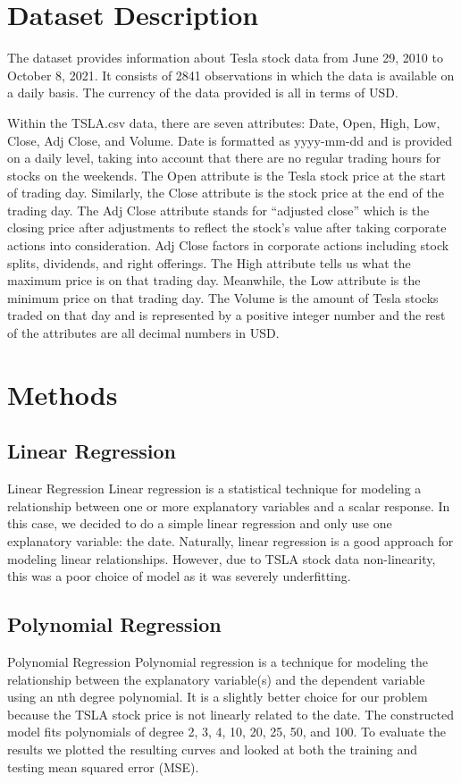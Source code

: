 \documentclass[12pt,a4paper]{article}
\begin{document}
\section{Dataset Description}
The dataset provides information about Tesla stock data from June 29, 2010 to October 8, 2021. It consists of 2841 observations in which the data is available on a daily basis. The currency of the data provided is all in terms of USD. 

Within the TSLA.csv data, there are seven attributes: Date, Open, High, Low, Close, Adj Close, and Volume. Date is formatted as yyyy-mm-dd and is provided on a daily level, taking into account that there are no regular trading hours for stocks on the weekends. The Open attribute is the Tesla stock price at the start of trading day. Similarly, the Close attribute is the stock price at the end of the trading day. The Adj Close attribute stands for “adjusted close” which is the closing price after adjustments to reflect the stock’s value after taking corporate actions into consideration. Adj Close factors in corporate actions including stock splits, dividends, and right offerings. The High attribute tells us what the maximum price is on that trading day. Meanwhile, the Low attribute is the minimum price on that trading day. The Volume is the amount of Tesla stocks traded on that day and is represented by a positive integer number and the rest of the attributes are all decimal numbers in USD. 



\section{Methods}


\subsection{Linear Regression}
Linear Regression
Linear regression is a statistical technique for modeling a relationship between one or more explanatory variables and a scalar response. In this case, we decided to do a simple linear regression and only use one explanatory variable: the date. Naturally, linear regression is a good approach for modeling linear relationships. However, due to TSLA stock data non-linearity, this was a poor choice of model as it was severely underfitting.

\subsection{Polynomial Regression}
Polynomial Regression
Polynomial regression is a technique for modeling the relationship between the explanatory variable(s) and the dependent variable using an nth degree polynomial. It is a slightly better choice for our problem because the TSLA stock price is not linearly related to the date. The constructed model fits polynomials of degree 2, 3, 4, 10, 20, 25, 50, and 100. To evaluate the results we plotted the resulting curves and looked at both the training and testing mean squared error (MSE).
\end{document}
